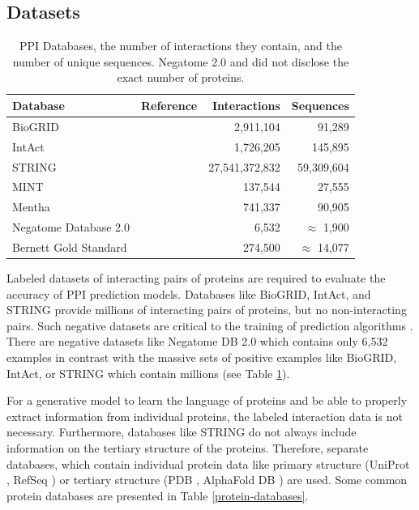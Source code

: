\documentclass{article}
\begin{document}
\subsection{Datasets}\label{Datasets}
\begin{table}
  \caption{PPI Databases, the number of interactions they contain, and the number of unique sequences. Negatome 2.0 \citep{blohm_negatome_2013} and \citet{bernett_cracking_2024} did not disclose the exact number of proteins.}
  \label{ppi-databases}
  \centering
  \begin{tabularx}{\textwidth}{l X r r}
    \toprule
    \textbf{Database} & \textbf{Reference} & \textbf{Interactions} & \textbf{Sequences}\\
    \midrule
    BioGRID & \citep{oughtred_biogrid_2021} & 2,911,104 & 91,289 \\
    IntAct & \citep{orchard_mintact_2013} & 1,726,205 & 145,895 \\
    STRING & \citep{szklarczyk_string_2022}  & 27,541,372,832 & 59,309,604 \\
    MINT & \citep{licata_mint_2011}  & 137,544 & 27,555 \\
    Mentha & \citep{calderone_mentha_2013}  & 741,337 & 90,905\\
    Negatome Database 2.0 & \citep{blohm_negatome_2013}  & 6,532 & \(\approx\) 1,900\\
    Bernett Gold Standard & \citep{bernett_cracking_2024}  & 274,500 & \(\approx\) 14,077 \\
    \bottomrule
  \end{tabularx}
\end{table}

Labeled datasets of interacting pairs of proteins are required to evaluate the accuracy of PPI prediction models. Databases like BioGRID, IntAct, and STRING provide millions of interacting pairs of proteins, but no non-interacting pairs. Such negative datasets are critical to the training of prediction algorithms \citep{ben-hur_choosing_2006}. There are negative datasets like Negatome DB 2.0 \citep{blohm_negatome_2013} which contains only 6,532 examples in contrast with the massive sets of positive examples like BioGRID, IntAct, or STRING which contain millions (see Table \ref{ppi-databases}).

For a generative model to learn the language of proteins and be able to properly extract information from individual proteins, the labeled interaction data is not necessary. Furthermore, databases like STRING \citep{szklarczyk_string_2022} do not always include information on the tertiary structure of the proteins. Therefore, separate databases, which contain individual protein data like primary structure (UniProt \citep{consortium_uniprot_2024}, RefSeq \citep{goldfarb_ncbi_2024}) or tertiary structure (PDB \citep{berman_protein_2000}, AlphaFold DB \citep{bertoni_alphafold_2025}) are used. Some common protein databases are presented in Table \ref{protein-databases}.
\end{document}
